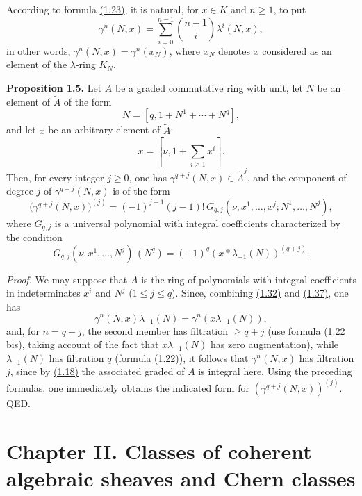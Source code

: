 According to formula \hyperlink{sga6.e00.eq.1-23}{(1.23)}, it is natural, for $x\in K$ and $n\geq 1$, to put
\begin{equation}\tag{1.37}
\gamma^n(N,x)=\sum_{i=0}^{n-1}\binom{n-1}{i}\lambda^i(N,x),
\end{equation}
in other words, $\gamma^n(N,x)=\gamma^n(x_N)$, where $x_N$ denotes $x$ considered as an element of the $\lambda$-ring $K_N$.

\textbf{Proposition 1.5.} Let $A$ be a graded commutative ring with unit, let $N$ be an element of $\widetilde A$ of the form
\[
N=[q,1+N^1+\cdots+N^q],
\]
and let $x$ be an arbitrary element of $\widetilde A$:
\[
x=[\nu,1+\sum_{i\geq 1}x^i].
\]
Then, for every integer $j\geq 0$, one has $\gamma^{q+j}(N,x)\in\widetilde A^j$, and the component of degree $j$ of $\gamma^{q+j}(N,x)$ is of the form
\begin{equation}\tag{1.38}
\bigl(\gamma^{q+j}(N,x)\bigr)^{(j)}=(-1)^{j-1}(j-1)!\,G_{q,j}(\nu,x^1,\ldots,x^j;N^1,\ldots,N^j),
\end{equation}
where $G_{q,j}$ is a universal polynomial with integral coefficients characterized by the condition
\begin{equation}\tag{1.39}
G_{q,j}(\nu,x^1,\ldots,N^j)\,(N^q)=(-1)^q(x*\lambda_{-1}(N))^{(q+j)}.
\end{equation}

\emph{Proof.} We may suppose that $A$ is the ring of polynomials with integral coefficients in indeterminates $x^i$ and $N^j$ ($1\leq j\leq q$). Since, combining \hyperlink{sga6.e00.eq.1-32}{(1.32)} and \hyperlink{sga6.e00.eq.1-37}{(1.37)}, one has
\begin{equation}\tag{1.40}
\gamma^n(N,x)\lambda_{-1}(N)=\gamma^n(x\lambda_{-1}(N)),
\end{equation}
and, for $n=q+j$, the second member has filtration $\geq q+j$ (use formula (\hyperlink{sga6.e00.eq.1-22}{1.22} bis), taking account of the fact that $x\lambda_{-1}(N)$ has zero augmentation), while $\lambda_{-1}(N)$ has filtration $q$ (formula \hyperlink{sga6.e00.eq.1-22}{(1.22)}), it follows that $\gamma^n(N,x)$ has filtration $j$, since by \hyperlink{sga6.e00.eq.1-18}{(1.18)} the associated graded of $A$ is integral here. Using the preceding formulas, one immediately obtains the indicated form for $(\gamma^{q+j}(N,x))^{(j)}$. QED.

\section*{Chapter II. Classes of coherent algebraic sheaves and Chern classes}

